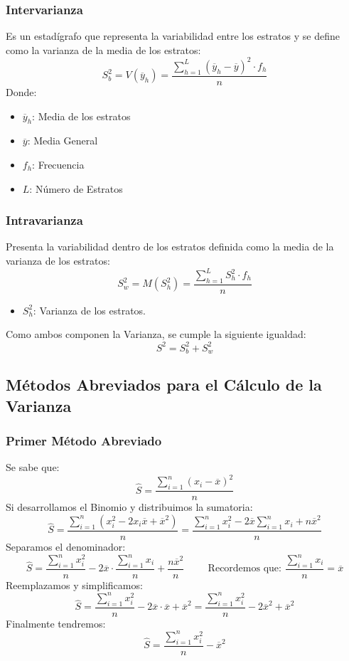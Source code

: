 \subsubsection{Intervarianza}
Es un estadígrafo que representa la variabilidad entre los estratos y se define como la varianza de la media de los estratos:
$$S_b^2=V(\overline{y}_h)=\dfrac{\displaystyle\sum_{h=1}^{L}(\overline{y}_h-\overline{y})^2 \cdot f_h}{n}$$
Donde:
\begin{itemize}
\item $\overline{y}_h$: Media de los estratos
\item $\overline{y}$: Media General 
\item $f_h$: Frecuencia
\item $L$: Número de Estratos
\end{itemize}
\subsubsection{Intravarianza}
Presenta la variabilidad dentro de los estratos definida como la media de la varianza de los estratos:
$$S_w^2=M(S_h^2)=\dfrac{\displaystyle\sum_{h=1}^{L}S_h^2 \cdot f_h}{n}$$
\begin{itemize}
\item $S_h^2$: Varianza de los estratos.
\end{itemize}
Como ambos componen la Varianza, se cumple la siguiente igualdad:
$$S^2=S_b^2+S_w^2$$
\subsection{Métodos Abreviados para el Cálculo de la Varianza}
\subsubsection{Primer Método Abreviado}
\noindent Se sabe que:
$$\hat{S}=\dfrac{\displaystyle\sum_{i=1}^{n}(x_i-\overline{x})^2}{n}$$
Si desarrollamos el Binomio y distribuimos la sumatoria:
$$\hat{S}=\dfrac{\displaystyle\sum_{i=1}^{n}(x_i^2-2x_i\overline{x}+\overline{x}^2)}{n}=
\dfrac{\displaystyle\sum_{i=1}^{n}x_i^2 - 2\overline{x}\displaystyle\sum_{i=1}^{n}x_i+n\overline{x}^2}{n}
$$
Separamos el denominador:
$$\hat{S}=\dfrac{\displaystyle\sum_{i=1}^{n}x_i^2}{n}-2\overline{x}\cdot\dfrac{\displaystyle\sum_{i=1}^{n}x_i}{n}+\dfrac{n\overline{x}^2}{n} \hspace{1cm} \textrm{Recordemos que: } \dfrac{\displaystyle\sum_{i=1}^{n}x_i}{n}=\overline{x}$$
Reemplazamos y simplificamos:
$$\hat{S}=\dfrac{\displaystyle\sum_{i=1}^{n}x_i^2}{n}-2\overline{x}\cdot\overline{x}+\overline{x}^2=\dfrac{\displaystyle\sum_{i=1}^{n}x_i^2}{n}-2\overline{x}^2+\overline{x}^2$$
Finalmente tendremos:
$$\hat{S}=\dfrac{\displaystyle\sum_{i=1}^{n}x_i^2}{n}-\overline{x}^2$$
